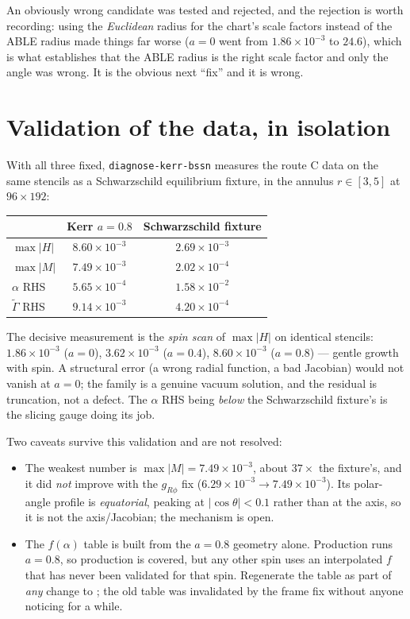 \documentclass[11pt,openany]{book}
\begin{document}
\gotcha
An obviously wrong candidate was tested and rejected, and the rejection is
worth recording: using the \emph{Euclidean} radius for the chart's scale
factors instead of the ABLE radius made things far worse ($a = 0$ went from
$1.86\times10^{-3}$ to $24.6$), which is what establishes that the ABLE
radius is the right scale factor and only the angle was wrong. It is the
obvious next ``fix'' and it is wrong.

\section{Validation of the data, in isolation}

With all three fixed, \texttt{diagnose-kerr-bssn} measures the route C data
on the same stencils as a Schwarzschild equilibrium fixture, in the annulus
$r \in [3,5]$ at $96\times192$:

\begin{center}
\begin{tabular}{@{}lcc@{}}
\toprule
 & Kerr $a=0.8$ & Schwarzschild fixture \\
\midrule
$\max|H|$ & $8.60\times10^{-3}$ & $2.69\times10^{-3}$ \\
$\max|M|$ & $7.49\times10^{-3}$ & $2.02\times10^{-4}$ \\
$\alpha$ RHS & $5.65\times10^{-4}$ & $1.58\times10^{-2}$ \\
$\tilde\Gamma$ RHS & $9.14\times10^{-3}$ & $4.20\times10^{-4}$ \\
\bottomrule
\end{tabular}
\end{center}

The decisive measurement is the \emph{spin scan} of $\max|H|$ on identical
stencils: $1.86\times10^{-3}$ ($a = 0$), $3.62\times10^{-3}$ ($a = 0.4$),
$8.60\times10^{-3}$ ($a = 0.8$) --- gentle growth with spin. A structural
error (a wrong radial function, a bad Jacobian) would not vanish at
$a = 0$; the family is a genuine vacuum solution, and the residual is
truncation, not a defect. The $\alpha$ RHS being \emph{below} the
Schwarzschild fixture's is the slicing gauge doing its job.

Two caveats survive this validation and are not resolved:
\begin{itemize}
\item The weakest number is $\max|M| = 7.49\times10^{-3}$, about $37\times$
      the fixture's, and it did \emph{not} improve with the $g_{R\phi}$ fix
      ($6.29\times10^{-3} \to 7.49\times10^{-3}$). Its polar-angle profile is
      \emph{equatorial}, peaking at $|\cos\theta| < 0.1$ rather than at the
      axis, so it is not the axis/Jacobian; the mechanism is open.
\item The $f(\alpha)$ table is built from the $a = 0.8$ geometry alone.
      Production runs $a = 0.8$, so production is covered, but any other
      spin uses an interpolated $f$ that has never been validated for that
      spin. Regenerate the table as part of \emph{any} change to
      ; the old table was invalidated by
      the frame fix without anyone noticing for a while.
\end{itemize}
\end{document}
